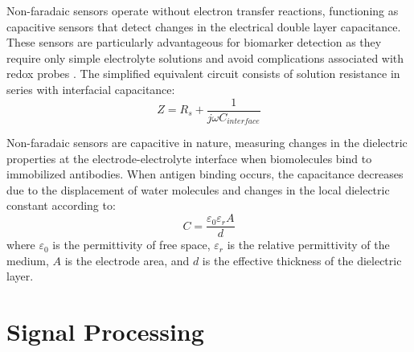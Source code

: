 Non-faradaic sensors operate without electron transfer reactions, functioning as capacitive sensors that detect changes in the electrical double layer capacitance. These sensors are particularly advantageous for biomarker detection as they require only simple electrolyte solutions and avoid complications associated with redox probes \cite{huangCapacitiveBiosensorsLabelfree2024}. The simplified equivalent circuit consists of solution resistance in series with interfacial capacitance:
\begin{equation}
    Z = R_s + \frac{1}{j\omega C_{interface}}
\end{equation}

Non-faradaic sensors are capacitive in nature, measuring changes in the dielectric properties at the electrode-electrolyte interface when biomolecules bind to immobilized antibodies. When antigen binding occurs, the capacitance decreases due to the displacement of water molecules and changes in the local dielectric constant according to:
\begin{equation}
    C = \frac{\varepsilon_0 \varepsilon_r A}{d}
\end{equation}
where $\varepsilon_0$ is the permittivity of free space, $\varepsilon_r$ is the relative permittivity of the medium, $A$ is the electrode area, and $d$ is the effective thickness of the dielectric layer.\cite{bergveldThirtyYearsBiosensor2003}


\section{Signal Processing}

